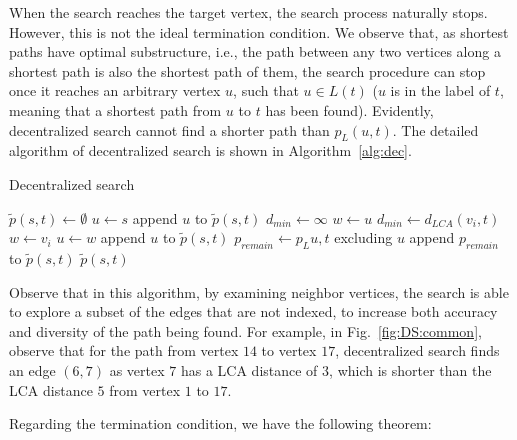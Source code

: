 When the search reaches the target vertex, the search process naturally stops. However, this is not the ideal termination condition. We observe that, as shortest paths have optimal substructure, i.e., the path between any two vertices along a shortest path is also the shortest path of them, the search procedure can stop once it reaches an arbitrary vertex $u$, such that $u \in L(t)$ ($u$ is in the label of $t$, meaning that a shortest path from $u$ to $t$ has been found). Evidently, decentralized search cannot find a shorter path than $p_L(u,t)$. The detailed algorithm of decentralized search is shown in Algorithm~\ref{alg:dec}.

\begin{algorithm}
    \caption{Decentralized search}
		\label{alg:dec}
    \begin{algorithmic}
						\State $\tilde{p}(s,t) \gets \emptyset$
						\State $u \gets s$
						\State append $u$ to $\tilde{p}(s,t)$
								\State $d_{min} \gets \infty$
								\State $w \gets u$
												\State $d_{min} \gets d_{LCA}(v_i,t)$
												\State $w \gets v_i$
										\EndIf
								\EndFor
								\State $u \gets w$
								\State append $u$ to $\tilde{p}(s,t)$
						\EndWhile
						\State $p_{remain} \gets p_L{u,t}$ excluding $u$
						\State append $p_{remain}$ to $\tilde{p}(s,t)$
						\State \Return $\tilde{p}(s,t)$
        \EndFunction
    \end{algorithmic}
\end{algorithm}

Observe that in this algorithm, by examining neighbor vertices, the search is able to explore a subset of the edges that are not indexed, to increase both accuracy and diversity of the path being found. For example, in Fig.~\ref{fig:DS:common}, observe that for the path from vertex $14$ to vertex $17$, decentralized search finds an edge $(6, 7)$ as vertex $7$ has a LCA distance of $3$, which is shorter than the LCA distance $5$ from vertex $1$ to $17$.

Regarding the termination condition, we have the following theorem:

